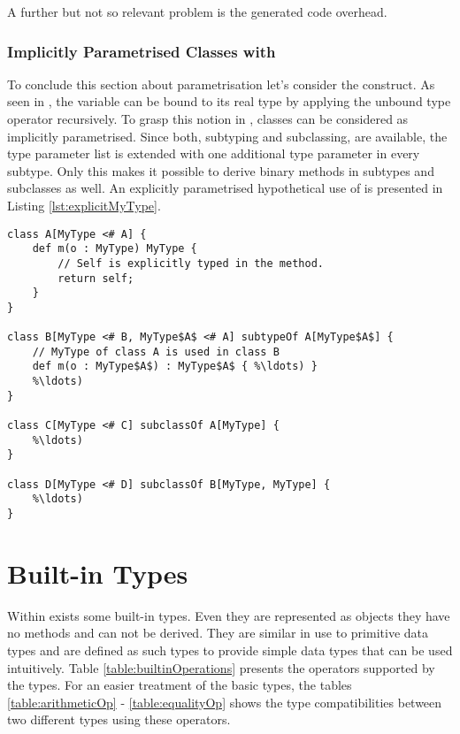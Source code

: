 A further but not so relevant problem is the generated code overhead.

\subsubsection{Implicitly Parametrised Classes with \mytype}
\label{sec:implicitlyMyType}
To conclude this section about parametrisation let's consider the
\mytype construct. As seen in , the
\self variable can be bound to its real type by applying the unbound
type operator recursively. To grasp this notion in \ooplss, classes
can be considered as implicitly parametrised. Since both, subtyping
and subclassing, are available, the type parameter list is extended
with one additional type parameter in every subtype. Only this makes it
possible to derive binary methods in subtypes and subclasses as well. An
explicitly parametrised hypothetical use of \mytype is presented in
Listing \ref{lst:explicitMyType}.

\begin{lstlisting}[language=ooplss,caption=Explicit \mytype parametrisation.,label=lst:explicitMyType]
class A[MyType <# A] {
	def m(o : MyType) MyType {
		// Self is explicitly typed in the method.
		return self;
	}
}

class B[MyType <# B, MyType$A$ <# A] subtypeOf A[MyType$A$] {
	// MyType of class A is used in class B
	def m(o : MyType$A$) : MyType$A$ { %\ldots) }
	%\ldots)
}

class C[MyType <# C] subclassOf A[MyType] {
	%\ldots)
}

class D[MyType <# D] subclassOf B[MyType, MyType] {
	%\ldots)
}
\end{lstlisting}

\section{Built-in Types}
\label{sec:builtinTypes}
Within \ooplss exists some built-in types. Even they are represented
as objects they have no methods and can not be derived. They are
similar in use to primitive data types and are defined as such types
to provide simple data types that can be used intuitively. Table
\ref{table:builtinOperations} presents the operators supported by
the types. For an easier treatment of the basic types, the tables
\ref{table:arithmeticOp} - \ref{table:equalityOp} shows the type
compatibilities between two different types using these operators.

